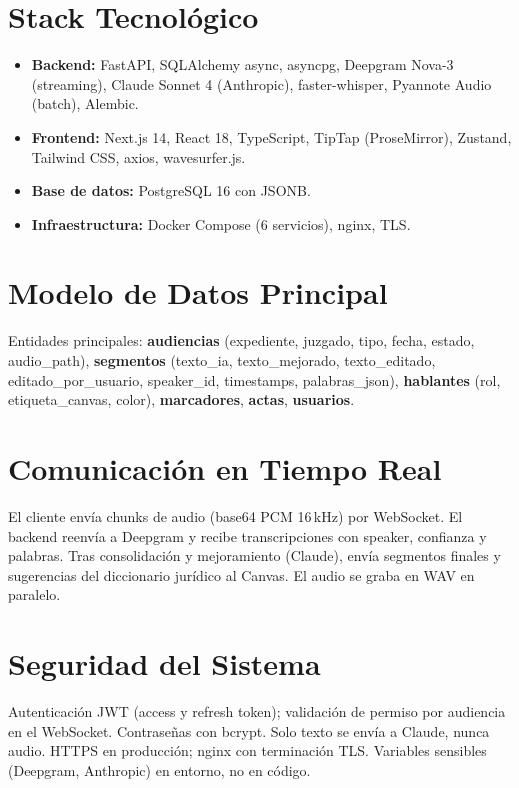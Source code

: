 \documentclass[12pt,a4paper]{report}
\begin{document}
\section{Stack Tecnológico}

\begin{itemize}
    \item \textbf{Backend:} FastAPI, SQLAlchemy async, asyncpg, Deepgram Nova-3 (streaming), Claude Sonnet 4 (Anthropic), faster-whisper, Pyannote Audio (batch), Alembic.
    \item \textbf{Frontend:} Next.js 14, React 18, TypeScript, TipTap (ProseMirror), Zustand, Tailwind CSS, axios, wavesurfer.js.
    \item \textbf{Base de datos:} PostgreSQL 16 con JSONB.
    \item \textbf{Infraestructura:} Docker Compose (6 servicios), nginx, TLS.
\end{itemize}

\section{Modelo de Datos Principal}

Entidades principales: \textbf{audiencias} (expediente, juzgado, tipo, fecha, estado, audio\_path), \textbf{segmentos} (texto\_ia, texto\_mejorado, texto\_editado, editado\_por\_usuario, speaker\_id, timestamps, palabras\_json), \textbf{hablantes} (rol, etiqueta\_canvas, color), \textbf{marcadores}, \textbf{actas}, \textbf{usuarios}.

\section{Comunicación en Tiempo Real}

El cliente envía chunks de audio (base64 PCM 16\,kHz) por WebSocket. El backend reenvía a Deepgram y recibe transcripciones con speaker, confianza y palabras. Tras consolidación y mejoramiento (Claude), envía segmentos finales y sugerencias del diccionario jurídico al Canvas. El audio se graba en WAV en paralelo.

\section{Seguridad del Sistema}

Autenticación JWT (access y refresh token); validación de permiso por audiencia en el WebSocket. Contraseñas con bcrypt. Solo texto se envía a Claude, nunca audio. HTTPS en producción; nginx con terminación TLS. Variables sensibles (Deepgram, Anthropic) en entorno, no en código.
\end{document}

